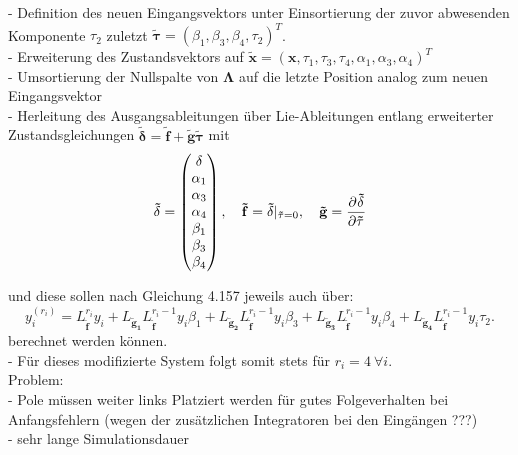- Definition des neuen Eingangsvektors unter Einsortierung der zuvor abwesenden Komponente $\tau_2$ zuletzt $\mathbf{\tilde{\tau}} = (\beta_1,  \beta_3,  \beta_4, \tau_2)^T$. \\

- Erweiterung des Zustandsvektors auf $\tilde{\mathbf{x}} = (\mathbf{x}, \tau_1, \tau_3, \tau_4, \alpha_1, \alpha_3, \alpha_4)^T$ \\
- Umsortierung der Nullspalte von $\mathbf{\Lambda}$ auf die letzte Position analog zum neuen Eingangsvektor \\
- Herleitung des Ausgangsableitungen über Lie-Ableitungen entlang erweiterter Zustandsgleichungen  $\mathbf{\tilde{\delta}} = \mathbf{\tilde{f}} + \mathbf{\tilde{g}} \mathbf{\tilde{\tau}}$ mit
\begin{align}
	\mathbf{\tilde{\delta}} =
	\left(\begin{matrix}
		\mathbf{\delta} \\
		\alpha_1 \\
		\alpha_3 \\
		\alpha_4 \\
		\beta_1 \\
		\beta_3 \\
		\beta_4 \\	
	\end{matrix}\right), \quad
	\mathbf{\tilde{f}} = \mathbf{\tilde{\delta}}|_{\mathbf{\tilde{\tau}} = 0}, \quad
	\mathbf{\tilde{g}} = \frac{\partial^{}\mathbf{\tilde{\delta}}}{\partial{\mathbf{\tilde{\tau}}}^{}}
\end{align}

und diese sollen nach \cite[S. 195]{NLRT_Roebenack} Gleichung 4.157 jeweils auch über:
\begin{equation}
	y_i^{(r_i)} = L_{\mathbf{\tilde{f}}}^{r_i} y_i + L_{\mathbf{\tilde{g}_1}} L_{\mathbf{\tilde{f}}}^{r_i-1} y_i \beta_1 + L_{\mathbf{\tilde{g}_2}} L_{\mathbf{\tilde{f}}}^{r_i-1} y_i \beta_3 + L_{\mathbf{\tilde{g}_3}} L_{\mathbf{\tilde{f}}}^{r_i-1} y_i \beta_4 + L_{\mathbf{\tilde{g}_4}} L_{\mathbf{\tilde{f}}}^{r_i-1} y_i \tau_2 .
\end{equation}
berechnet werden können.\\
- Für dieses modifizierte System folgt somit stets für $r_i = 4 \ \forall i$. \\

Problem:\\
- Pole müssen weiter links Platziert werden für gutes Folgeverhalten bei Anfangsfehlern (wegen der zusätzlichen Integratoren bei den Eingängen ???) \\
- sehr lange Simulationsdauer

